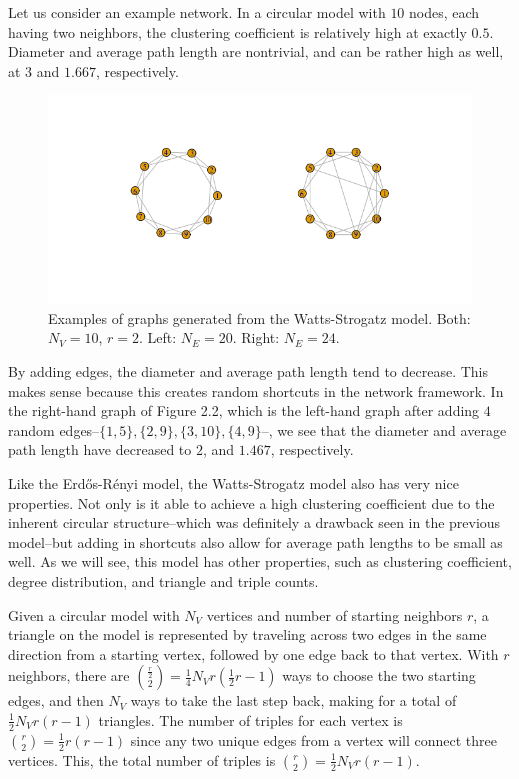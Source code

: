 \documentclass[12pt,twoside]{amherstthesis}
\begin{document}
  Let us consider an example network. In a circular model with \(10\)
  nodes, each having two neighbors, the clustering coefficient is
  relatively high at exactly \(0.5\). Diameter and average path length are
  nontrivial, and can be rather high as well, at \(3\) and \(1.667\),
  respectively.
  
  \begin{figure}[htbp]
  \centering
  \includegraphics{figure/22wattsstrogatzexample.png}
  \caption{Examples of graphs generated from the Watts-Strogatz model.
  Both: \(N_V = 10\), \(r = 2\). Left: \(N_E = 20\). Right: \(N_E = 24\).}
  \end{figure}
  
  By adding edges, the diameter and average path length tend to decrease.
  This makes sense because this creates random shortcuts in the network
  framework. In the right-hand graph of Figure 2.2, which is the left-hand
  graph after adding \(4\) random
  edges--\(\{1, 5\}, \{2, 9\}, \{3, 10\}, \{4, 9\}\)--, we see that the
  diameter and average path length have decreased to \(2\), and \(1.467\),
  respectively.
  
  Like the Erdős-Rényi model, the Watts-Strogatz model also has very nice
  properties. Not only is it able to achieve a high clustering coefficient
  due to the inherent circular structure--which was definitely a drawback
  seen in the previous model--but adding in shortcuts also allow for
  average path lengths to be small as well. As we will see, this model has
  other properties, such as clustering coefficient, degree distribution,
  and triangle and triple counts.
  
  Given a circular model with \(N_{V}\) vertices and number of starting
  neighbors \(r\), a triangle on the model is represented by traveling
  across two edges in the same direction from a starting vertex, followed
  by one edge back to that vertex. With \(r\) neighbors, there are
  \({\frac {r} {2} \choose 2} = \frac {1} {4} N_{V} r \left(\frac {1} {2} r - 1 \right)\)
  ways to choose the two starting edges, and then \(N_V\) ways to take the
  last step back, making for a total of \(\frac {1} {2} N_{V} r(r - 1)\)
  triangles. The number of triples for each vertex is
  \({r \choose 2} = \frac {1} {2}r(r - 1)\) since any two unique edges
  from a vertex will connect three vertices. This, the total number of
  triples is \({r \choose 2} = \frac {1} {2}N_{V}r(r - 1)\).
  
\end{document}
